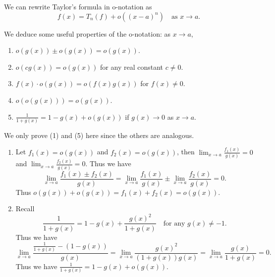         \begin{exampleenv}
            We can rewrite Taylor's formula in o-notation as
            \[
            f(x) = T_n(f) + o\left( (x-a)^n \right) \quad \text{as } x\to a.
            \]
        \end{exampleenv}
        \begin{theoremenv}
            We deduce some useful properties of the o-notation: as $x\to a$,
            \begin{enumerate}[label=(\arabic*)]
                \item $o(g(x)) \pm o(g(x)) = o(g(x)).$
                \item $o(cg(x)) = o(g(x))$ for any real constant $c\neq 0$.
                \item $f(x) \cdot o(g(x)) = o(f(x)g(x))$ for $f(x)\neq 0$.
                \item $o(o(g(x))) = o(g(x))$.
                \item $\displaystyle \frac{1}{1+g(x)} = 1 - g(x) + o(g(x))$ if $g(x)\to 0$ as $x\to a$.
            \end{enumerate}
        \end{theoremenv}
        \begin{proofenv}
            We only prove (1) and (5) here since the others are analogous.
            \begin{enumerate}[label=(\arabic*)]
                \item Let $f_1(x) = o(g(x))$ and $f_2(x) = o(g(x))$, then $\displaystyle \lim_{x\to a} \frac{f_1(x)}{g(x)} = 0$ and $\displaystyle \lim_{x\to a} \frac{f_2(x)}{g(x)} = 0$. Thus we have
                \[
                \lim_{x\to a} \frac{f_1(x) \pm f_2(x)}{g(x)} = \lim_{x\to a} \frac{f_1(x)}{g(x)} \pm \lim_{x\to a} \frac{f_2(x)}{g(x)} = 0.
                \]
                Thus $o(g(x)) + o(g(x)) = f_1(x) + f_2(x) = o(g(x))$.
                \item[(5)] Recall
                \[
                \frac{1}{1+g(x)} = 1 - g(x) + \frac{g(x)^2}{1+g(x)}\quad \text{for any } g(x)\neq -1.
                \]
                Thus we have
                \[
                \lim_{x\to a} \frac{\frac{1}{1+g(x)} - (1 - g(x))}{g(x)} = \lim_{x\to a} \frac{g(x)^2}{(1+g(x))g(x)} = \lim_{x\to a} \frac{g(x)}{1+g(x)} = 0.
                \]
                Thus we have $\displaystyle \frac{1}{1+g(x)} = 1 - g(x) + o(g(x))$.
            \end{enumerate}
        \end{proofenv}
